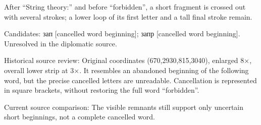 After “String theory:” and before “forbidden”, a short fragment is crossed out with several strokes; a lower loop of its first letter and a tall final stroke remain.\par
Candidates: зап [cancelled word beginning]; запр [cancelled word beginning]. Unresolved in the diplomatic source.\par
Historical source review: Original coordinates (670,2930,815,3040), enlarged 8×, overall lower strip at 3×. It resembles an abandoned beginning of the following word, but the precise cancelled letters are unreadable. Cancellation is represented in square brackets, without restoring the full word “forbidden”.\par
Current source comparison: The visible remnants still support only uncertain short beginnings, not a complete cancelled word.\par\medskip
